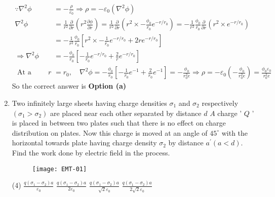 \begin{enumerate}
\begin{tasks}
\end{tasks}	
\begin{answer}
	$$
	\begin{aligned}
	\because \nabla^{2} \phi&=-\frac{\rho}{\varepsilon_{0}} \Rightarrow \rho=-\varepsilon_{0}\left(\nabla^{2} \phi\right)\\
	\nabla^{2} \phi&=\frac{1}{r^{2}} \frac{\partial}{\partial r}\left(r^{2} \frac{\partial \phi}{\partial r}\right)=\frac{1}{r^{2}} \frac{\partial}{\partial r}\left(r^{2} \times-\frac{\phi_{0}}{r_{0}} e^{-r / r_{0}}\right)=-\frac{1}{r^{2}} \frac{\phi_{0}}{r_{0}} \frac{\partial}{\partial r}\left(r^{2} \times e^{-r / r_{0}}\right)\\&=-\frac{1}{r^{2}} \frac{\phi_{0}}{r_{0}}\left[r^{2} \times-\frac{1}{r_{0}} e^{-r / r_{0}}+2 r e^{-r / r_{0}}\right]\\
	\Rightarrow \nabla^{2} \phi&=-\frac{\phi_{0}}{r_{0}}\left[-\frac{1}{r_{0}} e^{-r / r_{0}}+\frac{2}{r} e^{-r / r_{0}}\right]\\
	\text { At a distance } r&=r_{0}, \quad \nabla^{2} \phi=-\frac{\phi_{0}}{r_{0}}\left[-\frac{1}{r_{0}} e^{-1}+\frac{2}{r_{0}} e^{-1}\right]=-\frac{\phi_{0}}{r_{0}^{2} e} \Rightarrow \rho=-\varepsilon_{0}\left(-\frac{\phi_{0}}{r_{0}^{2} e}\right)=\frac{\phi_{0} \varepsilon_{0}}{r_{0}^{2} e}
\end{aligned}
$$
So the correct answer is \textbf{Option (a)}
\end{answer}
\item  Two infinitely large sheets having charge densities $\sigma_{1}$ and $\sigma_{2}$ respectively $\left(\sigma_{1}>\sigma_{2}\right)$ are placed near each other separated by distance $d$ $A$ charge ' $Q$ ' is placed in between two plates such that there is no effect on charge distribution on plates. Now this charge is moved at an angle of $45^{\circ}$ with the horizontal towards plate having charge density $\sigma_{2}$ by distance $a^{\prime}(a<d)$. Find the work done by electric field in the process.
\begin{figure}[H]
	\centering
	\texttt{[image: EMT-01]}
\end{figure}
 \begin{tasks}(4)
	\task[\textbf{a.}]$\frac{q\left(\sigma_{1}-\sigma_{2}\right) a}{\varepsilon_{0}}$
	\task[\textbf{b.}]$\frac{q\left(\sigma_{1}-\sigma_{2}\right) a}{2 \varepsilon_{0}}$
	\task[\textbf{c.}] $\frac{q\left(\sigma_{1}-\sigma_{2}\right) a}{\sqrt{2} \varepsilon_{0}}$
	\task[\textbf{d.}] $\frac{q\left(\sigma_{1}-\sigma_{2}\right) a}{2 \sqrt{2} \varepsilon_{0}}$	

\end{tasks}
\end{enumerate}

